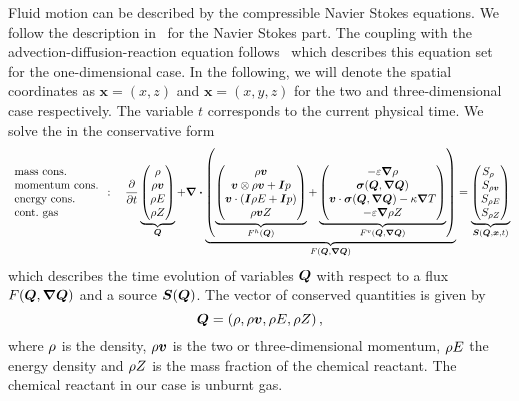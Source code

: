 Fluid motion can be described by the compressible Navier Stokes equations.
We follow the description in~\cite{dumbser2010arbitrary} for the Navier Stokes part.
The coupling with the advection-diffusion-reaction equation follows~\cite{hidalgo2011ader} which describes this equation set for the one-dimensional case.
In the following, we will denote the spatial coordinates as $\bm{x} = \left( x,z \right)$ and $\bm{x} = \left( x,y,z \right)$ for the two and three-dimensional case respectively.
The variable $t$ corresponds to the current physical time.
We solve the \pde{} in the conservative form%
\begin{equation}
 \label{eq:equation-set} 
 \begin{array}{l}
 \text{mass cons.} \\
 \text{momentum cons.} \\
 \text{energy cons.} \\
 \text{cont.\ gas} 
\end{array}
:
\quad
  \pdv{}{t}
  \underbrace{
  \begin{pmatrix}
    \Qrho\\
    \Qj\\
    \QE\\
    \QZ
    \end{pmatrix}}_{\Q}
  +
  \divergence{
  \underbrace{
  \left(
   \underbrace{\hyperFluxDef}_{\hyperFlux(\Q)}
+
\underbrace{\viscFluxDef}_{\viscFlux(\Q, \gradQ)}
  \right)}_{\flux(\Q, \gradQ)}}
 =
  \underbrace{
  \begin{pmatrix}
    \source[\Qrho\phantom{\Qrho}]\\
    \source[\Qj]\\
    \source[\QE]\\
    \source[\QZ]
    \end{pmatrix}}_{\source(\Q, \bm{x}, t)}
\end{equation}
which describes the time evolution of variables $\bm{Q}$ with respect to a flux $\flux(\Q, \gradQ)$ and a source $\source(\Q)$.
The vector of conserved quantities is given by
\begin{equation}
  \label{eq:conserved-variables}
 \bm{Q} = \left( \rho, \rho \bm{v}, \rho E, \rho Z \right),
\end{equation}
where $\rho$ is the density, $\rho \bm{v}$ is the two or three-dimensional momentum, $\rho E$ the energy density and $\rho Z$ is the mass fraction of the chemical reactant.
The chemical reactant in our case is unburnt gas.

